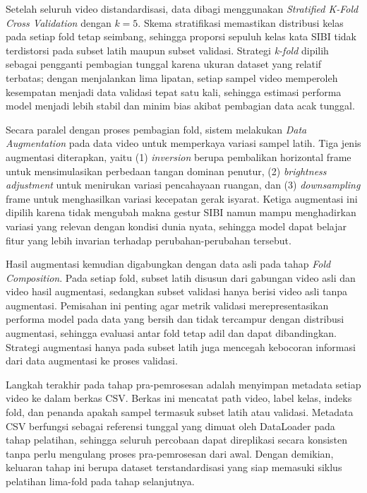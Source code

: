 Setelah seluruh video distandardisasi, data dibagi menggunakan \textit{Stratified K-Fold Cross Validation} dengan $k=5$. Skema stratifikasi memastikan distribusi kelas pada setiap fold tetap seimbang, sehingga proporsi sepuluh kelas kata SIBI tidak terdistorsi pada subset latih maupun subset validasi. Strategi \textit{k-fold} dipilih sebagai pengganti pembagian tunggal karena ukuran dataset yang relatif terbatas; dengan menjalankan lima lipatan, setiap sampel video memperoleh kesempatan menjadi data validasi tepat satu kali, sehingga estimasi performa model menjadi lebih stabil dan minim bias akibat pembagian data acak tunggal.\par

Secara paralel dengan proses pembagian fold, sistem melakukan \textit{Data Augmentation} pada data video untuk memperkaya variasi sampel latih. Tiga jenis augmentasi diterapkan, yaitu (1) \textit{inversion} berupa pembalikan horizontal frame untuk mensimulasikan perbedaan tangan dominan penutur, (2) \textit{brightness adjustment} untuk menirukan variasi pencahayaan ruangan, dan (3) \textit{downsampling} frame untuk menghasilkan variasi kecepatan gerak isyarat. Ketiga augmentasi ini dipilih karena tidak mengubah makna gestur SIBI namun mampu menghadirkan variasi yang relevan dengan kondisi dunia nyata, sehingga model dapat belajar fitur yang lebih invarian terhadap perubahan-perubahan tersebut.\par

Hasil augmentasi kemudian digabungkan dengan data asli pada tahap \textit{Fold Composition}. Pada setiap fold, subset latih disusun dari gabungan video asli dan video hasil augmentasi, sedangkan subset validasi hanya berisi video asli tanpa augmentasi. Pemisahan ini penting agar metrik validasi merepresentasikan performa model pada data yang bersih dan tidak tercampur dengan distribusi augmentasi, sehingga evaluasi antar fold tetap adil dan dapat dibandingkan. Strategi augmentasi hanya pada subset latih juga mencegah kebocoran informasi dari data augmentasi ke proses validasi.\par

Langkah terakhir pada tahap pra-pemrosesan adalah menyimpan metadata setiap video ke dalam berkas CSV. Berkas ini mencatat path video, label kelas, indeks fold, dan penanda apakah sampel termasuk subset latih atau validasi. Metadata CSV berfungsi sebagai referensi tunggal yang dimuat oleh DataLoader pada tahap pelatihan, sehingga seluruh percobaan dapat direplikasi secara konsisten tanpa perlu mengulang proses pra-pemrosesan dari awal. Dengan demikian, keluaran tahap ini berupa dataset terstandardisasi yang siap memasuki siklus pelatihan lima-fold pada tahap selanjutnya.\par



